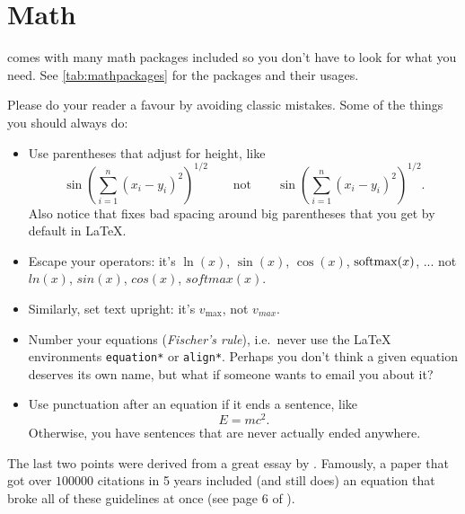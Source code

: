 \section{Math}
\repo comes with many math packages included so you don't have to look for what you need. See \autoref{tab:mathpackages} for the packages and their usages.

Please do your reader a favour by avoiding classic mistakes. Some of the things you should always do:
\begin{itemize}
	\item Use parentheses that adjust for height, like
	\begin{equation}
		\sin\left(\sum_{i=1}^{n} (x_i - y_i)^2 \right)^{\!1/2} \qquad\text{not}\qquad  \sin(\sum_{i=1}^{n} (x_i - y_i)^2 )^{1/2}.
	\end{equation}
	Also notice that \repo fixes bad spacing around big parentheses that you get by default in \LaTeX{}.

	\item Escape your operators: it's $\ln(x)$, $\sin(x)$, $\cos(x)$, $\operatorname{softmax}(x)$, ... not $ln(x)$, $sin(x)$, $cos(x)$, $softmax(x)$.

	\item Similarly, set text upright: it's $v_\text{max}$, not $v_{max}$.

	\item Number your equations (\emph*{Fischer's rule}), i.e.\ never use the \LaTeX{} environments \verb|equation*| or \verb|align*|. Perhaps you don't think a given equation deserves its own name, but what if someone wants to email you about it?

	\item Use punctuation after an equation if it ends a sentence, like
	\begin{equation}
		E = mc^2.
	\end{equation}
	Otherwise, you have sentences that are never actually ended anywhere.
\end{itemize}
The last two points were derived from a great essay by \textcite{mermin_whats_1989}. Famously, a paper that got over $\num{100000}$ citations in 5 years included (and still does) an equation that broke all of these guidelines at once (see page 6 of \cite{vaswani_attention_2017}).

